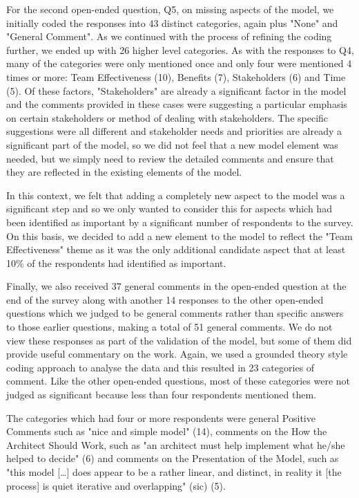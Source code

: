 For the second open-ended question, Q5, on missing aspects of the model, we initially coded the responses into 43 distinct categories, again plus "None" and "General Comment".  As we continued with the process of refining the coding further, we ended up with 26 higher level categories.  As with the responses to Q4, many of the categories were only mentioned once and only four were mentioned 4 times or more: Team Effectiveness (10), Benefits (7), Stakeholders (6) and Time (5).  Of these factors, "Stakeholders" are already a significant factor in the model and the comments provided in these cases were suggesting a particular emphasis on certain stakeholders or method of dealing with stakeholders.  The specific suggestions were all different and stakeholder needs and priorities are already a significant part of the model, so we did not feel that a new model element was needed, but we simply need to review the detailed comments and ensure that they are reflected in the existing elements of the model.

In this context, we felt that adding a completely new aspect to the model was a significant step and so we only wanted to consider this for aspects which had been identified as important by a significant number of respondents to the survey.  On this basis, we decided to add a new element to the model to reflect the "Team Effectiveness" theme as it was the only additional candidate aspect that at least 10\% of the respondents had identified as important.

Finally, we also received 37 general comments in the open-ended question at the end of the survey along with another 14 responses to the other open-ended questions which we judged to be general comments rather than specific answers to those earlier questions, making a total of 51 general comments.  We do not view these responses as part of the validation of the model, but some of them did provide useful commentary on the work.  Again, we used a grounded theory style coding approach to analyse the data and this resulted in 23 categories of comment.  Like the other open-ended questions, most of these categories were not judged as significant because less than four respondents mentioned them.

The categories which had four or more respondents were general Positive Comments such as "nice and simple model" (14), comments on the How the Architect Should Work, such as "an architect must help implement what he/she helped to decide" (6) and comments on the Presentation of the Model, such as "this model [\ldots] does appear to be a rather linear, and distinct,  in reality it [the process] is quiet iterative and overlapping" (sic) (5).

